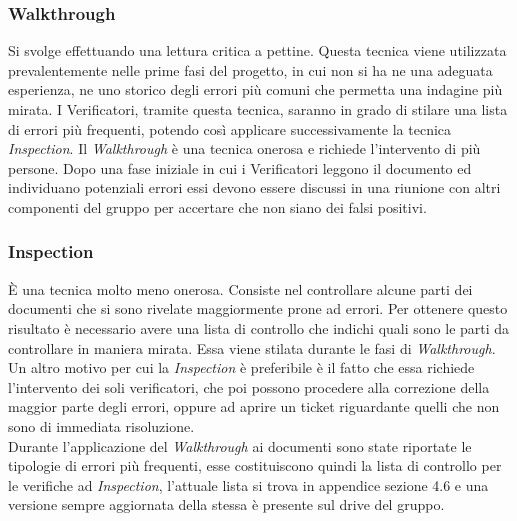 \documentclass[a4paper]{article}
\begin{document}
				\subsubsection{Walkthrough}
					Si svolge effettuando una lettura critica a pettine. Questa tecnica viene utilizzata prevalentemente 
					nelle prime fasi del progetto, in cui non si ha ne una adeguata esperienza, ne uno storico degli errori 
					più comuni che permetta una indagine più mirata. I Verificatori, tramite questa tecnica, saranno in 
					grado di stilare una lista di errori più frequenti, potendo così applicare successivamente la tecnica 
					\emph{Inspection}. Il \emph{Walkthrough} è una tecnica onerosa e richiede l'intervento di più persone. 
					Dopo una fase iniziale in cui i Verificatori leggono il documento ed individuano potenziali errori essi 
					devono essere discussi in una riunione con altri componenti del gruppo per accertare che non siano dei 
					falsi positivi.
				\subsubsection{Inspection}
					È una tecnica molto meno onerosa. Consiste nel controllare alcune parti dei documenti che si sono rivelate 
					maggiormente prone ad errori. Per ottenere questo risultato è necessario avere una lista di controllo che 
					indichi quali sono le parti da controllare in maniera mirata. Essa viene stilata durante le fasi di 
					\emph{Walkthrough}. Un altro motivo per cui la \emph{Inspection} è preferibile è il fatto che essa richiede 
					l'intervento dei soli verificatori, che poi possono procedere alla correzione della maggior parte degli errori, 
					oppure ad aprire un ticket riguardante quelli che non sono di immediata risoluzione.\\
					
					
				Durante l'applicazione del \emph{Walkthrough} ai documenti sono state riportate le tipologie di errori più frequenti, 
				esse costituiscono quindi la lista di controllo per le verifiche ad \emph{Inspection},
				l'attuale lista si trova in appendice sezione 4.6 e una versione sempre aggiornata della stessa è presente sul drive del gruppo.
				
\end{document}
